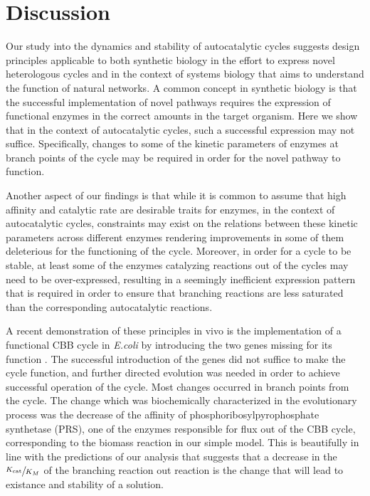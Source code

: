 \section{Discussion}
Our study into the dynamics and stability of autocatalytic cycles suggests design principles applicable to both synthetic biology in the effort to express novel heterologous cycles and in the context of systems biology that aims to understand the function of natural networks.
A common concept in synthetic biology is that the successful implementation of novel pathways requires the expression of functional enzymes in the correct amounts in the target organism.
Here we show that in the context of autocatalytic cycles, such a successful expression may not suffice.
Specifically, changes to some of the kinetic parameters of enzymes at branch points of the cycle may be required in order for the novel pathway to function.

Another aspect of our findings is that while it is common to assume that high affinity and catalytic rate are desirable traits for enzymes, in the context of autocatalytic cycles, constraints may exist on the relations between these kinetic parameters across different enzymes rendering improvements in some of them deleterious for the functioning of the cycle.
Moreover, in order for a cycle to be stable, at least some of the enzymes catalyzing reactions out of the cycles may need to be over-expressed, resulting in a seemingly inefficient expression pattern that is required in order to ensure that branching reactions are less saturated than the corresponding autocatalytic reactions.

A recent demonstration of these principles in vivo is the implementation of a functional CBB cycle in \emph{E.coli} by introducing the two genes missing for its function \cite{Antonovski2016}.
The successful introduction of the genes did not suffice to make the cycle function, and further directed evolution was needed in order to achieve successful operation of the cycle.
Most changes occurred in branch points from the cycle.
The change which was biochemically characterized in the evolutionary process was the decrease of the affinity of phosphoribosylpyrophosphate synthetase (PRS), one of the enzymes responsible for flux out of the CBB cycle, corresponding to the biomass reaction in our simple model.
This is beautifully in line with the predictions of our analysis that suggests that a decrease in the $\sfrac{K_{\text{cat}}}{K_M}$ of the branching reaction out reaction is the change that will lead to existance and stability of a solution.


